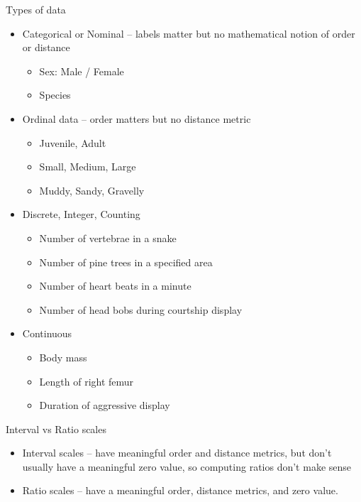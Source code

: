 \documentclass[presentation]{beamer}
\begin{document}
\begin{frame}[label={sec:orgheadline4}]{Types of data}
\begin{itemize}
\item Categorical or Nominal -- labels matter but no mathematical notion of order or distance
\begin{itemize}
\item Sex: Male / Female
\item Species
\end{itemize}

\item Ordinal data -- order matters but no distance metric 
\begin{itemize}
\item Juvenile, Adult
\item Small, Medium, Large
\item Muddy, Sandy, Gravelly
\end{itemize}

\item Discrete, Integer, Counting
\begin{itemize}
\item Number of vertebrae in a snake
\item Number of pine trees in a specified area
\item Number of heart beats in a minute
\item Number of head bobs during courtship display
\end{itemize}

\item Continuous
\begin{itemize}
\item Body mass
\item Length of right femur
\item Duration of aggressive display
\end{itemize}
\end{itemize}
\end{frame}

\begin{frame}[label={sec:orgheadline5}]{Interval vs Ratio scales}
\begin{itemize}
\item Interval scales -- have meaningful order and distance metrics, but don't usually have a meaningful zero value, so computing ratios don't make sense

\item Ratio scales -- have a meaningful order, distance metrics, and zero value.
\end{itemize}
\end{frame}
\end{document}
